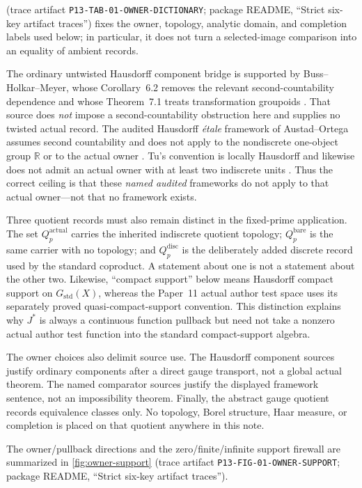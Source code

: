 \documentclass[11pt]{article}
\theoremstyle{definition}
\newcommand{\R}{\mathbb R}
\newcommand{\Gstd}{G_{\mathrm{std}}}
\newcommand{\TraceRef}[1]{(trace artifact \nolinkurl{#1}; package README,
``Strict six-key artifact traces'')}
\begin{document}
\TraceRef{P13-TAB-01-OWNER-DICTIONARY} fixes the owner, topology, analytic
domain, and completion labels used below; in particular, it does not turn a
selected-image comparison into an equality of ambient records.

The ordinary untwisted Hausdorff component bridge is supported by
Buss--Holkar--Meyer, whose Corollary~6.2 removes the relevant
second-countability dependence and whose Theorem~7.1 treats transformation
groupoids \citep[pp.~21, 23]{BussHolkarMeyer2018Universal}.  That source does
\emph{not} impose a second-countability obstruction here and supplies no
twisted actual record.  The audited Hausdorff \emph{étale} framework of
Austad--Ortega assumes second countability and does not apply to the
nondiscrete one-object group $\R$ or to the actual owner
\citep[arXiv v1, pp.~1, 3]{AustadOrtega2022Uniqueness}.  Tu's convention is
locally Hausdorff and likewise does not admit an actual owner with at least
two indiscrete units \citep[Definition 1.1 and Definition
4.6]{Tu2004NonHausdorff}.  Thus the correct ceiling is that these \emph{named
audited} frameworks do not apply to that actual owner---not that no
framework exists.

Three quotient records must also remain distinct in the fixed-prime
application.  The set $Q_p^{\mathrm{actual}}$ carries the inherited
indiscrete quotient topology; $Q_p^{\mathrm{bare}}$ is the same carrier with
no topology; and $Q_p^{\mathrm{disc}}$ is the deliberately added discrete
record used by the standard coproduct.  A statement about one is not a
statement about the other two.  Likewise, ``compact support'' below means
Hausdorff compact support on $\Gstd(X)$, whereas the Paper~11 actual author
test space uses its separately proved quasi-compact-support convention.
This distinction explains why $J^*$ is always a continuous function
pullback but need not take a nonzero actual author test function into the
standard compact-support algebra.

The owner choices also delimit source use.  The Hausdorff component sources
justify ordinary components after a direct gauge transport, not a global
actual theorem.  The named comparator sources justify the displayed
framework sentence, not an impossibility theorem.  Finally, the abstract
gauge quotient records equivalence classes only.  No topology, Borel
structure, Haar measure, or completion is placed on that quotient anywhere
in this note.

The owner/pullback directions and the zero/finite/infinite support firewall
are summarized in \cref{fig:owner-support}
\TraceRef{P13-FIG-01-OWNER-SUPPORT}.
\end{document}
